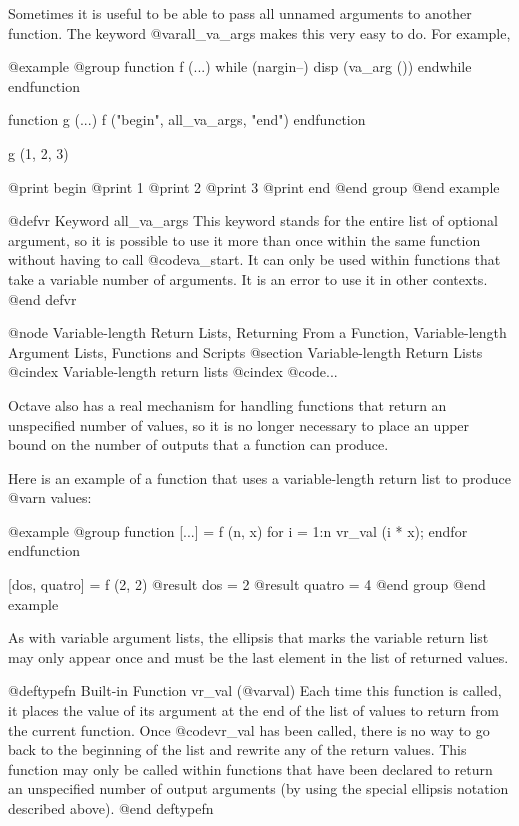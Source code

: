 Sometimes it is useful to be able to pass all unnamed arguments to
another function.  The keyword @var{all_va_args} makes this very easy to
do.  For example,

@example
@group
function f (...)
  while (nargin--)
    disp (va_arg ())
  endwhile
endfunction

function g (...)
  f ("begin", all_va_args, "end")
endfunction

g (1, 2, 3)

     @print{} begin
     @print{} 1
     @print{} 2
     @print{} 3
     @print{} end
@end group
@end example

@defvr {Keyword} all_va_args
This keyword stands for the entire list of optional argument, so it is
possible to use it more than once within the same function without
having to call @code{va_start}.  It can only be used within functions
that take a variable number of arguments.  It is an error to use it in
other contexts.
@end defvr

@node Variable-length Return Lists, Returning From a Function, Variable-length Argument Lists, Functions and Scripts
@section Variable-length Return Lists
@cindex Variable-length return lists
@cindex @code{...}

Octave also has a real mechanism for handling functions that return an
unspecified number of values, so it is no longer necessary to place an
upper bound on the number of outputs that a function can produce.

Here is an example of a function that uses a variable-length return list
to produce @var{n} values:

@example
@group
function [...] = f (n, x)
  for i = 1:n
    vr_val (i * x);
  endfor
endfunction

[dos, quatro] = f (2, 2)
     @result{} dos = 2
     @result{} quatro = 4
@end group
@end example

As with variable argument lists, the ellipsis that marks the variable
return list may only appear once and must be the last element in the
list of returned values.

@deftypefn {Built-in Function} {} vr_val (@var{val})
Each time this function is called, it places the value of its argument
at the end of the list of values to return from the current function.
Once @code{vr_val} has been called, there is no way to go back to the
beginning of the list and rewrite any of the return values.  This
function may only be called within functions that have been declared to
return an unspecified number of output arguments (by using the special
ellipsis notation described above).
@end deftypefn

